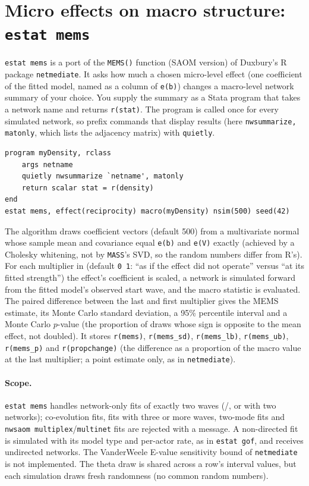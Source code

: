 \section{Micro effects on macro structure: \texttt{estat mems}}
\texttt{estat mems} is a port of the \texttt{MEMS()} function (SAOM version) of Duxbury's R package \texttt{netmediate}. It asks how much a chosen micro-level effect (one coefficient of the fitted model, named as a column of \texttt{e(b)}) changes a macro-level network summary of your choice. You supply the summary as a Stata program that takes a network name and returns \texttt{r(stat)}. The program is called once for every simulated network, so prefix commands that display results (here \texttt{nwsummarize, matonly}, which lists the adjacency matrix) with \texttt{quietly}.
\begin{lstlisting}
program myDensity, rclass
    args netname
    quietly nwsummarize `netname', matonly
    return scalar stat = r(density)
end
estat mems, effect(reciprocity) macro(myDensity) nsim(500) seed(42)
\end{lstlisting}
The algorithm draws  coefficient vectors (default 500) from a multivariate normal whose sample mean and covariance equal \texttt{e(b)} and \texttt{e(V)} exactly (achieved by a Cholesky whitening, not by \texttt{MASS}'s SVD, so the random numbers differ from R's). For each multiplier in  (default \texttt{0 1}: ``as if the effect did not operate'' versus ``at its fitted strength'') the effect's coefficient is scaled, a network is simulated forward from the fitted model's observed start wave, and the macro statistic is evaluated. The paired difference between the last and first multiplier gives the MEMS estimate, its Monte Carlo standard deviation, a 95\% percentile interval and a Monte Carlo $p$-value (the proportion of draws whose sign is opposite to the mean effect, not doubled). It stores \texttt{r(mems)}, \texttt{r(mems\_sd)}, \texttt{r(mems\_lb)}, \texttt{r(mems\_ub)}, \texttt{r(mems\_p)} and \texttt{r(propchange)} (the difference as a proportion of the macro value at the last multiplier; a point estimate only, as in \texttt{netmediate}).

\paragraph{Scope.} \texttt{estat mems} handles network-only fits of exactly two waves (/, or  with two networks); co-evolution fits, fits with three or more waves, two-mode fits and \texttt{nwsaom multiplex}/\texttt{multinet} fits are rejected with a message. A non-directed fit is simulated with its model type and per-actor rate, as in \texttt{estat gof}, and  receives undirected networks. The VanderWeele E-value sensitivity bound of \texttt{netmediate} is not implemented. The theta draw is shared across a row's interval values, but each simulation draws fresh randomness (no common random numbers).


